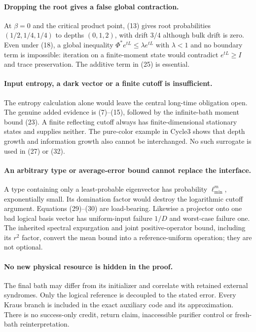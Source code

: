 \documentclass[11pt]{article}
\begin{document}
\paragraph{Dropping the root gives a false global contraction.}
At $\beta=0$ and the critical product point, (13) gives root probabilities
$(1/2,1/4,1/4)$ to depths $(0,1,2)$, with drift $3/4$ although bulk drift is
zero. Even under (18), a global inequality
$\Phi^*e^{tL}\le\lambda e^{tL}$ with $\lambda<1$ and no boundary term is
impossible: iteration on a finite-moment state would contradict $e^{tL}\ge I$
and trace preservation. The additive term in (25) is essential.

\paragraph{Input entropy, a dark vector or a finite cutoff is insufficient.}
The entropy calculation alone would leave the central long-time obligation
open. The genuine added evidence is (7)--(15), followed by the infinite-bath
moment bound (23). A finite reflecting cutoff always has finite-dimensional
stationary states and supplies neither. The pure-color example in Cycle3
shows that depth growth and information growth also cannot be interchanged.
No such surrogate is used in (27) or (32).

\paragraph{An arbitrary type or average-error bound cannot replace the interface.}
A type containing only a least-probable eigenvector has probability
$\ell_{\min}^m$, exponentially small. Its domination factor would destroy the
logarithmic cutoff argument. Equations (29)--(30) are load-bearing.
Likewise a projector onto one bad logical basis vector has uniform-input
failure $1/D$ and worst-case failure one. The inherited spectral expurgation
and joint positive-operator bound, including its $r^2$ factor, convert the
mean bound into a reference-uniform operation; they are not optional.

\paragraph{No new physical resource is hidden in the proof.}
The final bath may differ from its initializer and correlate with retained
external syndromes. Only the logical reference is decoupled to the stated
error. Every Kraus branch is included in the exact auxiliary code and its
approximation. There is no success-only credit, return claim, inaccessible
purifier control or fresh-bath reinterpretation.
\end{document}
